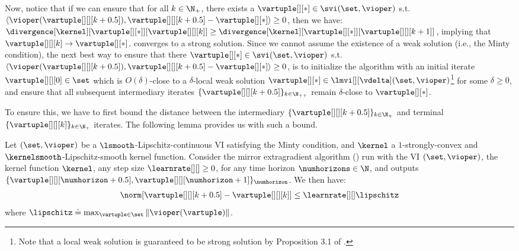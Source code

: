 Now, notice that if we can ensure that for all $k \in \N_+$, there exists a $\vartuple[][*] \in \svi(\set, \vioper)$ s.t. $\langle \vioper(\vartuple[][][k+0.5]),\vartuple[][][k+0.5]  - \vartuple[][*] \rangle \geq 0$, then we have: 
$\divergence[\kernel][{\vartuple[][*]}][{\vartuple[][][k]}] \geq \divergence[\kernel][{\vartuple[][*]}][{\vartuple[][][k+1]}]$, implying that $\vartuple[][][k] \to \vartuple[][*]$. converges to a strong solution. Since we cannot assume the existence of a weak solution (i.e., the Minty condition), the next best way to ensure that there $\vartuple[][*] \in \svi(\set, \vioper)$ s.t. $\langle \vioper(\vartuple[][][k+0.5]),\vartuple[][][k+0.5]  - \vartuple[][*] \rangle \geq 0$, is to initialize the algorithm with an initial iterate $\vartuple[][][0] \in \set$ which is $O(\delta)$-close to a $ \delta$-local weak solution $\vartuple[][*] \in \lmvi[][\vdelta](\set, \vioper)$\footnote{Note that a local weak solution is guaranteed to be strong solution by Proposition 3.1 of \citet{aussel2024variational}.} for some $\delta \geq 0$, and ensure that all subsequent intermediary iterates $\{\vartuple[][][k + 0.5]\}_{k \in \N_{++}}$ remain $\delta$-close to $\vartuple[][*]$.

To ensure this, we have to first bound the distance between the intermediary $\{\vartuple[][][k + 0.5]\}_{k \in \N_{+}}$ and terminal $\{\vartuple[][][k]\}_{k \in \N_{+}}$ iterates. The following lemma provides us with such a bound.

\begin{lemma}\label{lemma:extragrad_intermediate_iterate_dist}
        Let $(\set, \vioper)$ be a $\lsmooth$-Lipschitz-continuous VI satisfying the Minty condition, and $\kernel$ a $1$-strongly-convex and $\kernelsmooth$-Lipschitz-smooth kernel function. Consider the mirror extragradient algorithm ()  run with the VI $(\set, \vioper)$, the kernel function $\kernel$, any step size $\learnrate[ ][ ] \geq 0$, for any time horizon $\numhorizons \in \N$, and outputs $\{\vartuple[][][\numhorizon + 0.5], \vartuple[][][\numhorizon + 1]\}_{\numhorizon}$. We then have:
    \begin{align}
        \norm[{\vartuple[][][k+0.5] - \vartuple[][][k]}] \leq \learnrate[ ][ ] \lipschitz
    \end{align}
    where $\lipschitz \doteq \max_{\vartuple \in \set} \| \vioper(\vartuple)\|$.
\end{lemma}

